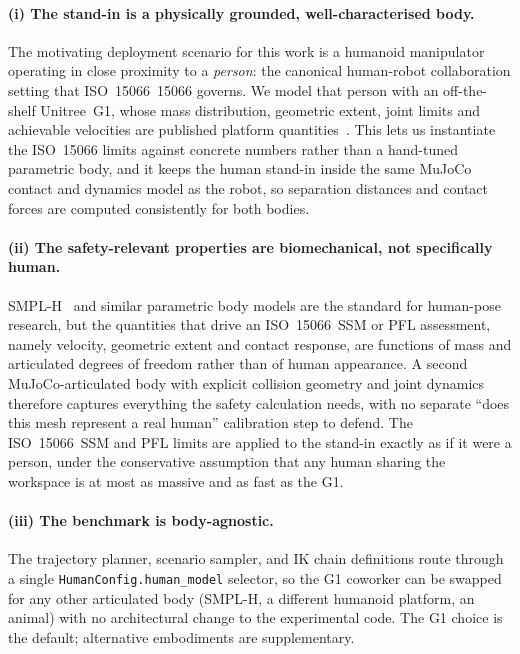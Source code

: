 \documentclass[11pt,a4paper]{report}
\newcommand{\ssm}{SSM}
\newcommand{\pfl}{PFL}
\newcommand{\iso}{ISO~15066}
\begin{document}
\paragraph{(i) The stand-in is a physically grounded, well-characterised body.}
The motivating deployment scenario for this work is a humanoid
manipulator operating in close proximity to a \emph{person}: the
canonical human-robot collaboration setting that \iso{}~15066
governs. We model that person with an off-the-shelf Unitree~G1,
whose mass distribution, geometric extent, joint limits and
achievable velocities are published platform
quantities~\cite{unitree_g1}. This lets us instantiate the \iso{}
limits against concrete numbers rather than a hand-tuned parametric
body, and it keeps the human stand-in inside the same MuJoCo contact
and dynamics model as the robot, so separation distances and contact
forces are computed consistently for both bodies.

\paragraph{(ii) The safety-relevant properties are biomechanical, not specifically human.}
SMPL-H~\cite{romero2017smplh} and similar parametric body models
are the standard for human-pose research, but the quantities that
drive an \iso{}~\ssm{} or \pfl{} assessment, namely velocity,
geometric extent and contact response, are functions of mass and
articulated degrees of freedom rather than of human appearance. A
second MuJoCo-articulated body with explicit collision geometry and
joint dynamics therefore captures everything the safety calculation
needs, with no separate ``does this mesh represent a real human''
calibration step to defend. The \iso{}~\ssm{} and \pfl{} limits are
applied to the stand-in exactly as if it were a person, under the
conservative assumption that any human sharing the workspace is at
most as massive and as fast as the G1.

\paragraph{(iii) The benchmark is body-agnostic.}
The trajectory planner, scenario sampler, and IK chain definitions
route through a single \texttt{HumanConfig.human\_model} selector,
so the G1 coworker can be swapped for any other articulated body
(SMPL-H, a different humanoid platform, an animal) with no
architectural change to the experimental code. The G1 choice is
the default; alternative embodiments are supplementary.
\end{document}
